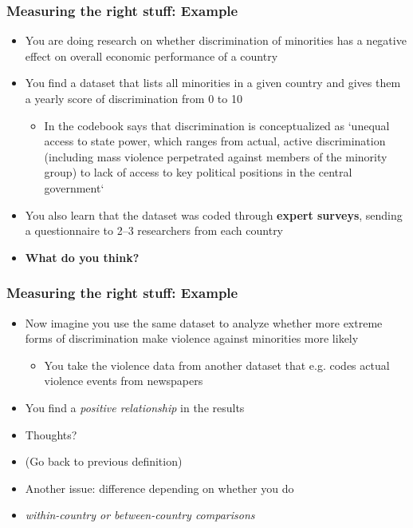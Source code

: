 \documentclass[aspectratio=43]{beamer}
\begin{document}
\begin{frame}
\frametitle{Measuring the right stuff: Example}
\centering

\begin{itemize}
  \item You are doing research on whether discrimination of minorities has a negative effect on overall economic performance of a country
  \item<2-> You find a dataset that lists all minorities in a given country and gives them a yearly score of discrimination from 0 to 10
  \begin{itemize}
    \item In the codebook says that discrimination is conceptualized as `unequal access to state power, which ranges from actual, active discrimination (including mass violence perpetrated against members of the minority group) to lack of access to key political positions in the central government`
  \end{itemize}
  \item<3-> You also learn that the dataset was coded through \textbf{expert surveys}, sending a questionnaire to 2--3 researchers from each country
  \item<4-> \textbf{What do you think?}
\end{itemize}

\end{frame}

\begin{frame}
\frametitle{Measuring the right stuff: Example}
\centering

\begin{itemize}
  \item Now imagine you use the same dataset to analyze whether more extreme forms of discrimination make violence against minorities more likely
  \begin{itemize}
    \item You take the violence data from another dataset that e.g. codes actual violence events from newspapers
  \end{itemize}
  \item You find a \textit{positive relationship} in the results
  \item Thoughts?
  \item<2-> (Go back to previous definition)
  \item<3-> Another issue: difference depending on whether you do
  \item<3->[] \textit{within-country or between-country comparisons}
\end{itemize}

\end{frame}
\end{document}
